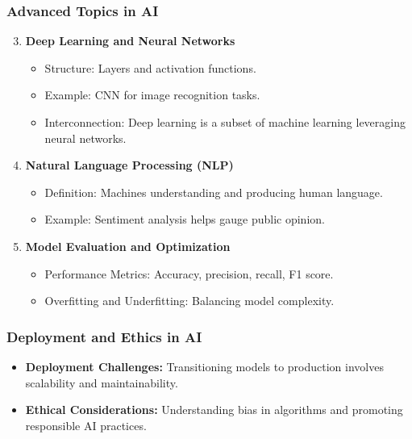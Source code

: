 \documentclass[aspectratio=169]{beamer}
\begin{document}
\begin{frame}[fragile]
    \frametitle{Advanced Topics in AI}
    \begin{enumerate}
        \setcounter{enumi}{2}
        \item \textbf{Deep Learning and Neural Networks}
            \begin{itemize}
                \item Structure: Layers and activation functions.
                \item Example: CNN for image recognition tasks.
                \item Interconnection: Deep learning is a subset of machine learning leveraging neural networks.
            \end{itemize}
        
        \item \textbf{Natural Language Processing (NLP)}
            \begin{itemize}
                \item Definition: Machines understanding and producing human language.
                \item Example: Sentiment analysis helps gauge public opinion.
            \end{itemize}
        
        \item \textbf{Model Evaluation and Optimization}
            \begin{itemize}
                \item Performance Metrics: Accuracy, precision, recall, F1 score.
                \item Overfitting and Underfitting: Balancing model complexity.
            \end{itemize}
    \end{enumerate}
\end{frame}

\begin{frame}[fragile]
    \frametitle{Deployment and Ethics in AI}
    \begin{itemize}
        \item \textbf{Deployment Challenges:} Transitioning models to production involves scalability and maintainability.
        \item \textbf{Ethical Considerations:} Understanding bias in algorithms and promoting responsible AI practices.
    \end{itemize}
\end{frame}
\end{document}
